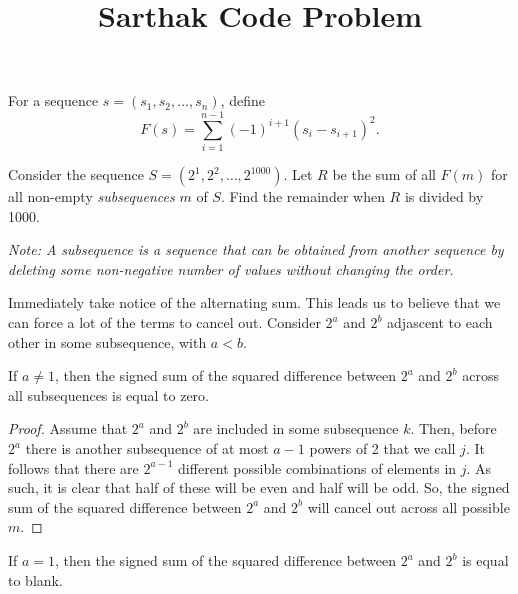 \documentclass[11pt]{scrartcl}
\title{Sarthak Code Problem}
\begin{document}
For a sequence $s = (s_{1}, s_{2}, \dots, s_{n})$, define
\[F(s) = \sum_{i = 1}^{n - 1} (-1)^{i + 1}(s_{i} - s_{i + 1})^{2}.\]

Consider the sequence $S = (2^{1}, 2^{2}, \dots, 2^{1000})$. Let $R$ be the sum of all 
$F(m)$ for all non-empty \emph{subsequences} $m$ of $S$. Find the remainder when $R$ is divided by 1000.

\emph{Note: A subsequence is a sequence that can be obtained from another sequence by deleting some non-negative number of values without changing the order.}

\begin{soln}

    Immediately take notice of the alternating sum. This leads us to believe that we can force a lot of the terms to cancel out. Consider $2^{a}$ and $2^{b}$ adjascent to each other in some subsequence, with $a < b$.

    \begin{claim}
        If $a \neq 1$, then the signed sum of the squared difference between $2^{a}$ and $2^{b}$ across all subsequences is equal to zero.
    \end{claim}

    \begin{proof}
        Assume that $2^{a}$ and $2^{b}$ are included in some subsequence $k$. Then, before $2^{a}$ there is another subsequence of at most $a - 1$ powers of 2 that we call $j$. It follows that there are $2^{a - 1}$ different possible combinations of elements in $j$. As such, it is clear that half of these will be even and half will be odd. So, the signed sum of the squared difference between $2^{a}$ and $2^{b}$ will cancel out across all possible $m$.
    \end{proof}

    \begin{claim}
        If $a = 1$, then the signed sum of the squared difference between $2^{a}$ and $2^{b}$ is equal to blank.
    \end{claim}


\end{soln}
\end{document}
